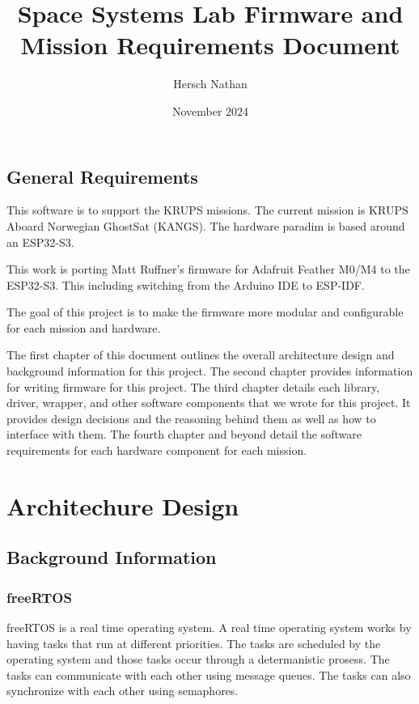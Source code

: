 \documentclass{book}
\title{Space Systems Lab Firmware and Mission Requirements Document}
\author{Hersch Nathan}
\date{November 2024}
\begin{document}
\maketitle

\section{General Requirements}
\par This software is to support the KRUPS missions. The current mission is KRUPS Aboard Norwegian GhostSat (KANGS). The hardware paradim is based around an ESP32-S3. 
\par This work is porting Matt Ruffner's firmware for Adafruit Feather M0/M4 to the ESP32-S3. This including switching from the Arduino IDE to ESP-IDF.
\par The goal of this project is to make the firmware more modular and configurable for each mission and hardware.
\par The first chapter of this document outlines the overall architecture design and background information for this project. The second chapter provides information for writing firmware for this project. The third chapter details each library, driver, wrapper, and other software components that we wrote for this project. It provides design decisions and the reasoning behind them as well as how to interface with them. The fourth chapter and beyond detail the software requirements for each hardware component for each mission.

\tableofcontents

\chapter{Architechure Design} 
\section{Background Information}

\subsection{freeRTOS}
\par freeRTOS is a real time operating system. A real time operating system works by having tasks that run at different priorities. The tasks are scheduled by the operating system and those tasks occur through a determanistic prosess. The tasks can communicate with each other using message queues. The tasks can also synchronize with each other using semaphores.
\end{document}
